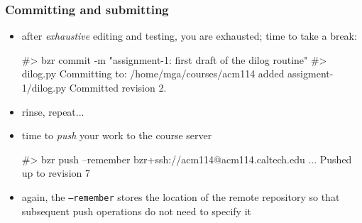 \begin{frame}[fragile]
%
  \frametitle{Committing and submitting}
%
  \begin{itemize}
%
    \item after {\em exhaustive} editing and testing, you are exhausted; time to take a break:
    \begin{shell}{}
#> bzr commit -m "assignment-1: first draft of the dilog routine"
#>     dilog.py
Committing to: /home/mga/courses/acm114
added assigment-1/dilog.py
Committed revision 2.
    \end{shell}
%
  \item rinse, repeat...
%
  \item time to {\em push} your work to the course server
    \begin{shell}{}
#> bzr push --remember bzr+ssh://acm114@acm114.caltech.edu
...
Pushed up  to revision 7
    \end{shell}
%
  \item again, the {\tt\small --remember} stores the location of the remote repository so that
    subsequent push operations do not need to specify it
  \end{itemize}
%
\end{frame}

